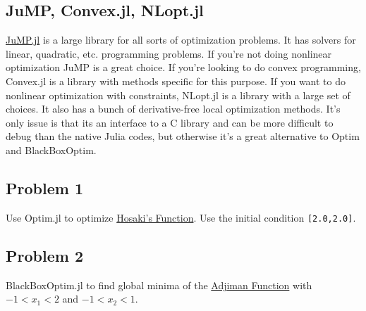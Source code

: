 \documentclass[11pt]{article}
\begin{document}
\begin{Verbatim}[commandchars=\\\{\}]
\end{Verbatim}
        
    \subsection{JuMP, Convex.jl, NLopt.jl}\label{jump-convex.jl-nlopt.jl}

\href{https://jump.readthedocs.io/en/latest/quickstart.html}{JuMP.jl} is
a large library for all sorts of optimization problems. It has solvers
for linear, quadratic, etc. programming problems. If you're not doing
nonlinear optimization JuMP is a great choice. If you're looking to do
convex programming, Convex.jl is a library with methods specific for
this purpose. If you want to do nonlinear optimization with constraints,
NLopt.jl is a library with a large set of choices. It also has a bunch
of derivative-free local optimization methods. It's only issue is that
its an interface to a C library and can be more difficult to debug than
the native Julia codes, but otherwise it's a great alternative to Optim
and BlackBoxOptim.

    \subsection{Problem 1}\label{problem-1}

Use Optim.jl to optimize
\href{http://al-roomi.org/benchmarks/unconstrained/2-dimensions/58-hosaki-s-function}{Hosaki's
Function}. Use the initial condition \texttt{{[}2.0,2.0{]}}.

\subsection{Problem 2}\label{problem-2}

BlackBoxOptim.jl to find global minima of the
\href{https://arxiv.org/pdf/1308.4008.pdf}{Adjiman Function} with
$-1 < x_1 < 2$ and $-1 < x_2 < 1$.


    
    
    
    
\end{document}
